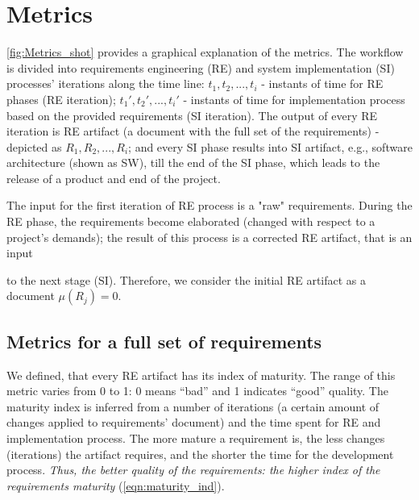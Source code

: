 \section{Metrics}
\label{sec:Solution} 

%

%
\autoref{fig:Metrics_shot} provides a graphical explanation of the metrics. The workflow is divided into requirements engineering (RE) 
and system implementation (SI) processes' iterations along the time line: $t_{1},t_{2},...,t_{i}$ - 
instants of time for RE phases (RE iteration); $t_{1}',t_{2}',...,t_{i}'$ - 
instants of time for implementation process based on the provided requirements (SI iteration).
The output of every RE iteration is RE artifact (a document with the full set of the requirements) - depicted as $R_{1},R_{2},...,R_{i}$; and every SI phase results into SI artifact, 
e.g., software architecture (shown as SW), till the end of the SI phase, which leads to the release of a product and end of the project. 

The input for the first iteration of RE process is a "raw" requirements. During the RE phase, the requirements become elaborated (changed with respect to a project's demands); the result of this process is a corrected RE artifact, that is an input 

\newpage
\hfill \break

\vspace{5.4cm}

to the next stage (SI). Therefore, we consider the initial RE artifact as a document \textit{$\mu(R_{j})=0$}. 
 
\subsection{Metrics for a full set of requirements}

We defined, that every RE artifact has its index of maturity. The range of this metric varies from 0 to 1: 0 means ``bad'' and 1 indicates ``good'' quality.
The maturity index is inferred from a number of iterations (a certain amount of changes applied to requirements' document) and the time spent for RE and implementation process.
The more mature a requirement is, the less changes (iterations) the artifact requires, and the shorter the time for the development process. 
\textsl{Thus, the better quality of the requirements: the higher index of the requirements maturity} (\autoref{eqn:maturity_ind}). 

